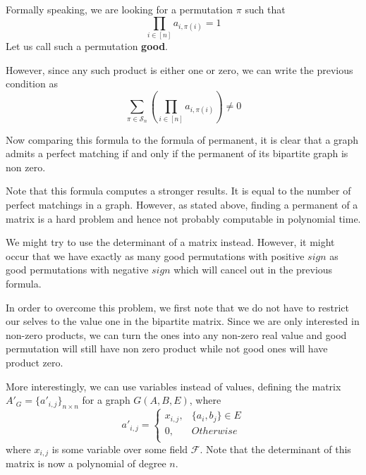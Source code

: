 Formally speaking, we are looking for a permutation $\pi$ such that
\[
	\prod\limits_{i \in [n]} a_{i, \pi(i)} = 1
\]
Let us call such a permutation \textbf{good}.

However, since any such product is either one or zero, we can write the previous condition as
\[
	\sum\limits_{\pi \in \mathcal{S}_n}\left( \prod\limits_{i \in [n]} a_{i, \pi(i)}\right) \neq 0
\]

Now comparing this formula to the  formula of permanent, it is clear that a graph admits a perfect matching if and only if the permanent of its bipartite graph is non zero.

Note that this formula computes a stronger results. It is equal to the number of perfect matchings in a graph. However, as stated above, finding a permanent of a matrix is a hard problem and hence not probably computable in polynomial time.

We might try to use the determinant of a matrix instead. However, it might occur that we have exactly as many good permutations with positive $sign$ as good permutations with negative $sign$ which will cancel out in the previous formula.

In order to overcome this problem, we first note that we do not have to restrict our selves to the value one in the bipartite matrix. Since we are only interested in non-zero products, we can turn the ones into any non-zero real value and good permutation will still have non zero product while not good ones will have product zero.

More interestingly, we can use variables instead of values, defining the matrix $A'_G = \{a'_{i,j}\}_{n\times n}$ for a graph $G(A, B, E)$, where
	\begin{equation*}
		a'_{i,j} =
		\begin{cases}
			x_{i,j}, & \{a_i, b_j\} \in E\\
			0, & Otherwise\\
		\end{cases}
	\end{equation*}
	where $x_{i, j}$ is some variable over some field $\mathcal{F}$. Note that the determinant of this matrix is now a polynomial of degree $n$.
	
